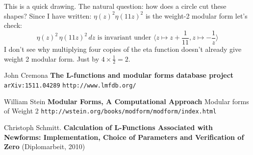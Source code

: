 \documentclass[12pt]{article}
\begin{document}
  \\ \\
This is a quick drawing.  The natural question: how does a circle cut these shapes? Since I have written: $ \eta(z)^2 \eta(11z)^2 $ is the weight-2 modular form let's check:
$$ \eta(z)^2 \, \eta(11z)^2 \, dz \text{ is invariant under } \Big\langle z \mapsto z + \frac{1}{11}, z \mapsto - \frac{1}{z} \Big\rangle $$
I don't see why multiplying four copies of the eta function doesn't already give weight 2 modular form.  Just by $4 \times \frac{1}{2} = 2$.  

\vfill

\selectfont \fontsize{12}{10}\selectfont

\begin{thebibliography}{}

\item John Cremona \textbf{The L-functions and modular forms database project}  \texttt{arXiv:1511.04289}  
\texttt{http://www.lmfdb.org/}

\item William Stein \textbf{Modular Forms, A Computational Approach} Modular forms of Weight 2 \texttt{http://wstein.org/books/modform/modform/index.html}

\item Christoph Schmitt. \textbf{Calculation of L-Functions Associated with
Newforms: Implementation, Choice of
Parameters and Verification of Zero} (Diplomarbeit, 2010)

\end{thebibliography}
\end{document}

